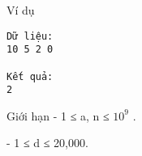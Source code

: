 Ví dụ
\begin{verbatim}
Dữ liệu:
10 5 2 0

Kết quả:
2
\end{verbatim}
Giới hạn
- 1 ≤ a, n ≤ $10^{9}$   .   


   - 1 ≤ d ≤ 20,000.